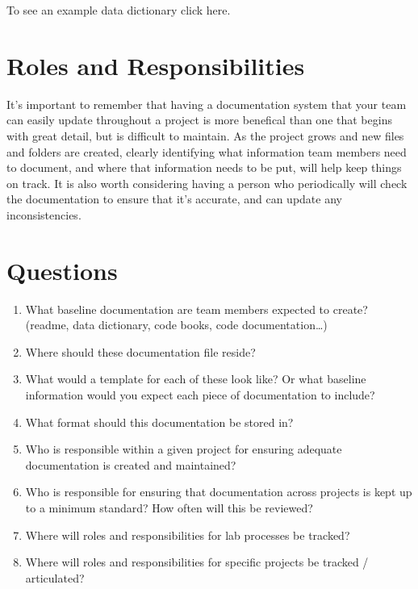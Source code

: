 \documentclass[
]{book}
\providecommand{\tightlist}{%
  \setlength{\itemsep}{0pt}\setlength{\parskip}{0pt}}
\begin{document}
To see an example data dictionary click here.

\hypertarget{roles-and-responsibilities-3}{%
\section*{Roles and Responsibilities}\label{roles-and-responsibilities-3}}

It's important to remember that having a documentation system that your team can easily update throughout a project is more benefical than one that begins with great detail, but is difficult to maintain. As the project grows and new files and folders are created, clearly identifying what information team members need to document, and where that information needs to be put, will help keep things on track. It is also worth considering having a person who periodically will check the documentation to ensure that it's accurate, and can update any inconsistencies.

\hypertarget{questions-5}{%
\section*{Questions}\label{questions-5}}

\begin{enumerate}
\def\labelenumi{\arabic{enumi}.}
\tightlist
\item
  What baseline documentation are team members expected to create? (readme, data dictionary, code books, code documentation\ldots)
\item
  Where should these documentation file reside?
\item
  What would a template for each of these look like? Or what baseline information would you expect each piece of documentation to include?
\item
  What format should this documentation be stored in?
\item
  Who is responsible within a given project for ensuring adequate documentation is created and maintained?
\item
  Who is responsible for ensuring that documentation across projects is kept up to a minimum standard? How often will this be reviewed?
\item
  Where will roles and responsibilities for lab processes be tracked?
\item
  Where will roles and responsibilities for specific projects be tracked / articulated?
\end{enumerate}
\end{document}
